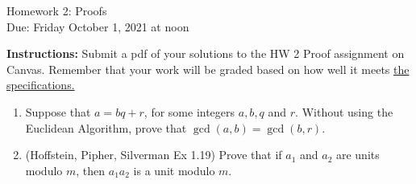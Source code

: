 \documentclass[10pt,a4paper]{article}
\begin{document}
\begin{center}
{\Large Homework 2: Proofs}\\
Due: Friday October 1, 2021 at noon\\


\end{center}
{\bf Instructions:} Submit a pdf of your solutions to the HW 2 Proof assignment on Canvas. Remember that your work will be graded based on how well it meets \href{https://docs.google.com/document/d/1emM06_WRh_h941rsjtRE9fRVndJtfRKd9gyS3Fs_rFA/edit?usp=sharing}{the specifications. }

\begin{enumerate}


\item Suppose that $a=bq+r$, for some integers $a,b, q$ and $r$. Without using the Euclidean Algorithm, prove that $\gcd(a,b)=\gcd(b,r)$.  
\item(Hoffstein, Pipher, Silverman Ex 1.19) Prove that if $a_1$ and $a_2$ are units modulo $m$, then $a_1a_2$ is a unit modulo $m$.
\end{enumerate}
\end{document}
